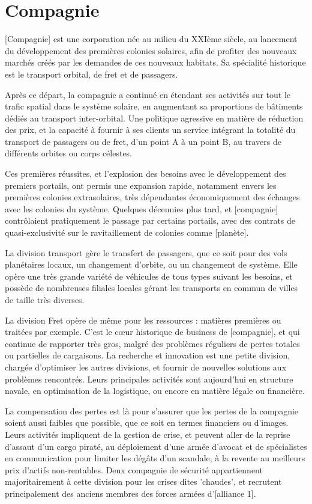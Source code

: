 \documentclass[10pt,a4paper]{book}
\begin{document}
\chapter{Compagnie}
\begin{multicols}{2}

[Compagnie] est une corporation née au milieu du XXIème siècle, au lancement du développement des premières colonies solaires, afin de profiter des nouveaux marchés créés par les demandes de ces nouveaux habitats. Sa spécialité historique est le transport orbital, de fret et de passagers.

Après ce départ, la compagnie a continué en étendant ses activités sur tout le trafic spatial dans le système solaire, en augmentant sa proportions de bâtiments dédiés au transport inter-orbital. Une politique agressive en matière de réduction des prix, et la capacité à fournir à ses clients un service intégrant la totalité du transport de passagers ou de fret, d'un point A à un point B, au travers de différents orbites ou corps célestes.

Ces premières réussites, et l'explosion des besoins avec le développement des premiers portails, ont permis une expansion rapide, notamment envers les premières colonies extrasolaires, très dépendantes économiquement des échanges avec les colonies du système. Quelques décennies plus tard, et [compagnie] contrôlaient pratiquement le passage par certains portails, avec des contrats de quasi-exclusivité sur le ravitaillement de colonies comme [planète]. 

La division transport gère le transfert de passagers, que ce soit pour des vols planétaires locaux, un changement d'orbite, ou un changement de système. Elle opère une très grande variété de véhicules de tous types suivant les besoins, et possède de nombreuses filiales locales gérant les transports en commun de villes de taille très diverses.

La division Fret opère de même pour les ressources : matières premières ou traitées par exemple. C'est le cœur historique de business de [compagnie], et qui continue de rapporter très gros, malgré des problèmes réguliers de pertes totales ou partielles de cargaisons.
La recherche et innovation est une petite division, chargée d'optimiser les autres divisions, et fournir de nouvelles solutions aux problèmes rencontrés. Leurs principales activités sont aujourd'hui en structure navale, en optimisation de la logistique, ou encore en matière légale ou financière.

La compensation des pertes est là pour s'assurer que les pertes de la compagnie soient aussi faibles que possible, que ce soit en termes financiers ou d'images. Leurs activités impliquent de la gestion de crise, et peuvent aller de la reprise d'assaut d'un cargo piraté, au déploiement d'une armée d'avocat et de spécialistes en communication pour limiter les dégâts d'un scandale, à la revente au meilleurs prix d'actifs non-rentables. Deux compagnie de sécurité appartiennent majoritairement à cette division pour les crises dites 'chaudes', et recrutent principalement des anciens membres des forces armées d'[alliance 1].


\end{multicols}
\end{document}

